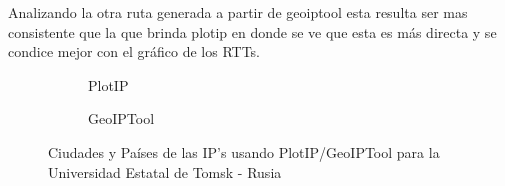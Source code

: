Analizando la otra ruta generada a partir de geoiptool esta resulta ser
mas consistente que la que brinda plotip en donde se ve que esta es más directa
y se condice mejor con el gráfico de los RTTs.

\begin{figure}[ht]
	\begin{subfigure}[b]{0.5\textwidth}
		\centering
		
		\caption{PlotIP}
	\end{subfigure}
	\begin{subfigure}[b]{0.5\textwidth}
		\centering
		
		\caption{GeoIPTool}
	\end{subfigure}
	\caption{Ciudades y Países de las IP's usando PlotIP/GeoIPTool para la Universidad Estatal de Tomsk - Rusia}
	\label{fig:lugares_tsu}
\end{figure}

